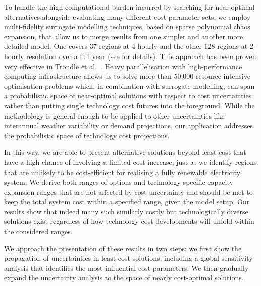 
To handle the high computational burden incurred by searching for near-optimal
alternatives alongside evaluating many different cost parameter sets, we employ
multi-fidelity surrogate modelling techniques, based on sparse polynomial chaos
expansion, that allow us to merge results from one simpler and another more
detailed model. One covers 37 regions at 4-hourly and the other 128 regions at
2-hourly resolution over a full year (see  for
details). This approach has been proven very effective in Tröndle et
al.~\cite{trondle_trade-offs_2020}. Heavy parallelisation with high-performance
computing infrastructure allows us to solve more than 50,000 resource-intensive
optimisation problems which, in combination with surrogate modelling, can span a
probabilistic space of near-optimal solutions with respect to cost uncertainties
rather than putting single technology cost futures into the foreground. While
the methodology is general enough to be applied to other uncertainties like
interannual weather variability or demand projections, our application addresses
the probabilistic space of technology cost projections.


In this way, we are able to present alternative solutions beyond least-cost that
have a high chance of involving a limited cost increase, just as we identify
regions that are unlikely to be cost-efficient for realising a fully renewable
electricity system. We derive both ranges of options and technology-specific
capacity expansion ranges that are not affected by cost uncertainty and should
be met to keep the total system cost within a specified range, given the model
setup. Our results show that indeed many such similarly costly but
technologically diverse solutions exist regardless of how technology cost
developments will unfold within the considered ranges.

We approach the presentation of these results in two steps: we first show the
propagation of uncertainties in least-cost solutions, including a global
sensitivity analysis that identifies the most influential cost parameters. We
then gradually expand the uncertainty analysis to the space of nearly
cost-optimal solutions.
